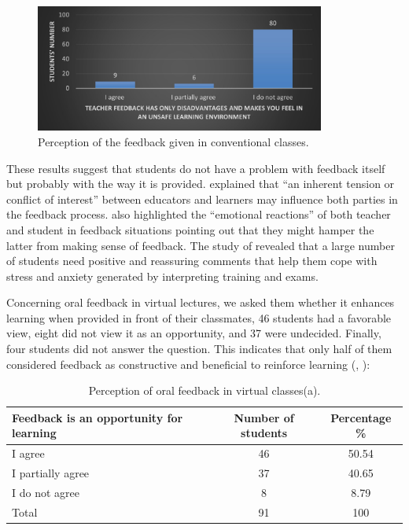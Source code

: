 \documentclass[english]{textolivre}
\begin{document}
\begin{figure}[h!]
 \centering
 \begin{minipage}{.85\textwidth}
 \includegraphics[width=0.85\textwidth]{13.jpg}
 \caption{Perception of the feedback given in conventional classes.}
 \label{fig13}
 \end{minipage}
\end{figure}

These results suggest that students do not have a problem with feedback itself but probably with the way it is provided. \textcite[p. 796]{leighton_students_2019} explained that “an inherent tension or conﬂict of interest” between educators and learners may influence both parties in the feedback process. \textcite[p. 1409]{henderson_conditions_2019} also highlighted the “emotional reactions” of both teacher and student in feedback situations pointing out that they might hamper the latter from making sense of feedback. The study of \textcite[p. 163-164]{lee_feedback_2018} revealed that a large number of students need positive and reassuring comments that help them cope with stress and anxiety generated by interpreting training and exams.

Concerning oral feedback in virtual lectures, we asked them whether it enhances learning when provided in front of their classmates, 46 students had a favorable view, eight did not view it as an opportunity, and 37 were undecided. Finally, four students did not answer the question. This indicates that only half of them considered feedback as constructive and beneficial to reinforce learning (, ):

\begin{table}[h!]
\centering
\begin{threeparttable}
\caption{Perception of oral feedback in virtual classes(a).}
\label{tbl14}
\begin{tabular}{p{} c c}
\toprule
Feedback is an opportunity for learning & Number of students & Percentage \% \\ \midrule
I agree & 46 & 50.54 \\
I partially agree & 37 & 40.65 \\
I do not agree & 8 & 8.79 \\
Total & 91 & 100 \\
\bottomrule
\end{tabular}
\end{threeparttable}
\end{table}
\end{document}

